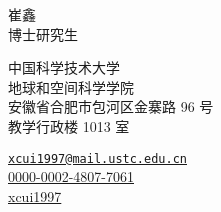 \documentclass[11pt,a4paper]{article}
\makeatletter
\newcommand{\Name}{崔鑫}
\newcommand{\Role}{博士研究生}
\newcommand{\Email}{xcui1997@mail.ustc.edu.cn}
\newcommand{\Github}{xcui1997}
\newcommand{\Orcid}{0000-0002-4807-7061}
\newcommand{\Affiliation}{中国科学技术大学\\ 地球和空间科学学院}
\newcommand{\Address}{安徽省合肥市包河区金寨路 96 号\\ 教学行政楼 1013 室}
\makeatother
\begin{document}
\thispagestyle{empty} %
\begin{center}
\kaishu
{\fontsize{24pt}{0}\selectfont \Name \hspace{1ex}} \\[0.4cm]
{\fontsize{16pt}{0}\selectfont \Role} \\[0.2cm]
\end{center}
\begin{minipage}[t]{0.7\textwidth}
  \kaishu
  \fontsize{12pt}{15pt}\selectfont
  \Affiliation
  \\
  \Address
\end{minipage}
\begin{minipage}[t]{0.3\textwidth}
  \kaishu
  \fontsize{12pt}{15pt}\selectfont
  \begin{flushleft}
    \faEnvelope \href{mailto:\Email}{\texttt{\Email}}
    \\
    \faOrcid \href{https://orcid.org/\Orcid}{\Orcid}
    \\
    \faGithub \href{https://github.com/\Github}{\Github}
  \end{flushleft}
\end{minipage}
\vspace{0.2cm}

% 


% 

% 


% 
% 
% 

% 
\end{document}

